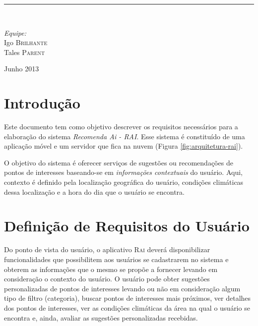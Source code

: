 \documentclass[11pt,a4paper,oneside]{article}
\newcommand{\HRule}{\rule{\linewidth}{0.5mm}}
\begin{document}
\begin{titlepage}
\begin{center}
\HRule \\[1.5cm]

\begin{minipage}{0.4\textwidth}
\begin{flushleft} \large
\emph{Equipe:}\\
Igo \textsc{Brilhante}\\
Tales \textsc{Parent}
\end{flushleft}
\end{minipage}

\vfill

{\large Junho 2013}

\end{center}
\end{titlepage}

\section{Introdução}

Este documento tem como objetivo descrever os requisitos necessários para a elaboração do sistema \emph{Recomenda Ai - RAI}. Esse sistema é constituído de uma aplicação móvel e um servidor que fica na nuvem (Figura \ref{fig:arquitetura-rai}).

O objetivo do sistema é oferecer serviços de sugestões ou recomendações de pontos de interesses baseando-se em \emph{informações contextuais} do usuário. Aqui, contexto é definido pela localização geográfica do usuário, condições climáticas dessa localização e a hora do dia que o usuário se encontra.

\section{Definição de Requisitos do Usuário}

Do ponto de vista do usuário, o aplicativo \textsc{Rai} deverá disponibilizar funcionalidades que possibilitem aos usuários se cadastrarem no sistema e obterem as informações que o mesmo se propõe a fornecer levando em consideração o contexto do usuário. O usuário pode obter sugestões personalizadas de pontos de interesses levando ou não em consideração algum tipo de filtro (categoria), buscar pontos de interesses mais próximos, ver detalhes dos pontos de interesses, ver as condições climáticas da área na qual o usuário se encontra e, ainda, avaliar as sugestões personalizadas recebidas.
\end{document}
